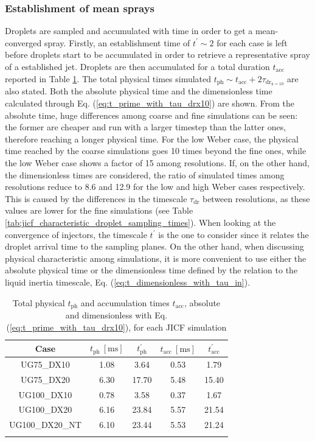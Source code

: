 \subsubsection*{Establishment of mean sprays}

Droplets are sampled and accumulated with time in order to get a mean-converged spray. Firstly, an establishment time of $t^{\prime} \sim 2$ for each case is left before droplets start to be accumulated in order to retrieve a representative spray of a established jet. Droplets are then accumulated for a total duration $t_\mathrm{acc}$ reported in Table \ref{tab:jicf_SLI_t_prime_accumulation}. The total physical times simulated $t_\mathrm{ph} \sim t_\mathrm{acc} + 2 \tau_\mathrm{dr_{x=10}}$ are also stated. Both the absolute physical time and the dimensionless time calculated through Eq. (\ref{eq:t_prime_with_tau_drx10}) are shown. From the absolute time, huge differences among coarse and fine simulations can be seen: the former are cheaper and run with a larger timestep than the latter ones, therefore reaching a longer physical time. For the low Weber case, the physical time reached by the coarse simulations goes 10 times beyond the fine ones, while the low Weber case shows a factor of 15 among resolutions. If, on the other hand, the dimensionless times are considered, the ratio of simulated times among resolutions reduce to 8.6 and 12.9 for the low and high Weber cases respectively. This is caused by the differences in the timescale $\tau_\mathrm{dr}$ between resolutions, as these values are lower for the fine simulations (see Table \ref{tab:jicf_characteristic_droplet_sampling_times}). When looking at the convergence of injectors, the timescale $t^{\prime}$ is the one to consider since it relates the droplet arrival time to the sampling planes. On the other hand, when discussing physical characteristic among simulations, it is more convenient to use either the absolute physical time or the dimensionless time defined by the relation to the liquid inertia timescale, Eq. (\ref{eq:t_dimensionless_with_tau_in}).


\begin{table}[!h]
\centering
\caption{Total physical $t_\mathrm{ph}$ and accumulation times $t_\mathrm{acc}$, absolute and dimensionless with Eq. (\ref{eq:t_prime_with_tau_drx10}), for each JICF simulation}
\begin{tabular}{ccccc}
\thickhline
\textbf{Case} & $t_\mathrm{ph}~[\mathrm{ms}]$ &  $t_\mathrm{ph}^{\prime}$ & $t_\mathrm{acc}~[\mathrm{ms}]$  & $t_\mathrm{acc}^{\prime}$  \\
\hline
UG75\_DX10 & 1.08 & 3.64 & 0.53 & 1.79 \\
UG75\_DX20 & 6.30 & 17.70 & 5.48  & 15.40 \\
UG100\_DX10 & 0.78  & 3.58 & 0.37 & 1.67 \\
UG100\_DX20  & 6.16 & 23.84 & 5.57 & 21.54 \\
UG100\_DX20\_NT  & 6.10  & 23.44 & 5.53 &  21.24 \\
\thickhline
\end{tabular}
\label{tab:jicf_SLI_t_prime_accumulation}
\end{table}


